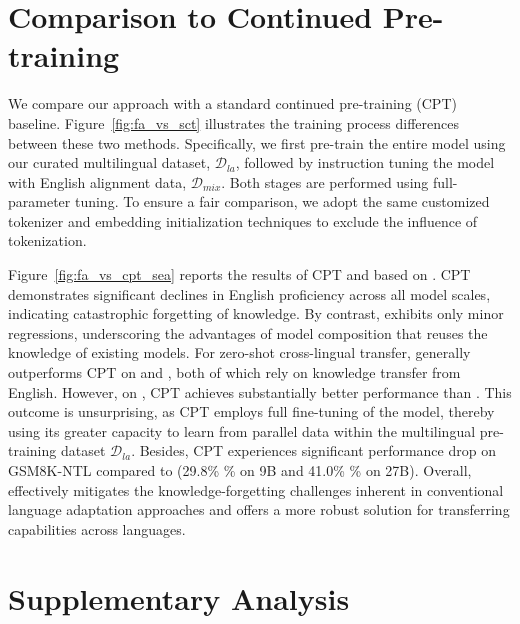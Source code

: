 \section{Comparison to Continued Pre-training}\label{appendix:cpt}
We compare our \ouradapter approach with a standard continued pre-training (CPT) baseline. Figure~\ref{fig:fa_vs_sct} illustrates the training process differences between these two methods. Specifically, we first pre-train the entire model using our curated multilingual dataset, $\mathcal{D}_{la}$, followed by instruction tuning the model with English alignment data, $\mathcal{D}_{mix}$. Both stages are performed using full-parameter tuning. To ensure a fair comparison, we adopt the same customized tokenizer and embedding initialization techniques to exclude the influence of tokenization.

Figure~\ref{fig:fa_vs_cpt_sea} reports the results of CPT and \ouradapter based on \gemmatwo. CPT demonstrates significant declines in English proficiency across all model scales, indicating  catastrophic forgetting of knowledge. By contrast, \ouradapter exhibits only minor regressions, underscoring the advantages of model composition that reuses the knowledge of existing models. For zero-shot cross-lingual transfer, \ouradapter generally outperforms CPT on \belebele and \sib, both of which rely on knowledge transfer from English. However, on \flores, CPT achieves substantially better performance than \ouradapter. This outcome is unsurprising, as CPT employs full fine-tuning of the model, thereby using its greater capacity to learn from parallel data within the multilingual pre-training dataset $\mathcal{D}_{la}$. Besides, CPT experiences significant performance drop on GSM8K-NTL compared to \ouradapter (29.8\% \% on 9B and 41.0\% \% on 27B). Overall, \ouradapter effectively mitigates the knowledge-forgetting challenges inherent in conventional language adaptation approaches and offers a more robust solution for transferring capabilities across languages.

\section{Supplementary Analysis}\label{appendix:supplementary_analysis}

